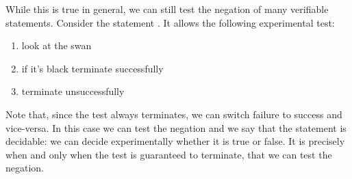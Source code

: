 \documentclass[11pt,letterpaper,fleqn]{memoir} %
\begin{document}
While this is true in general, we can still test the negation of many verifiable statements. Consider the statement . It allows the following experimental test:
\begin{enumerate}
	\item look at the swan
	\item if it's black terminate successfully
	\item terminate unsuccessfully
\end{enumerate}
Note that, since the test always terminates, we can switch failure to success and vice-versa. In this case we can test the negation and we say that the statement is decidable: we can decide experimentally whether it is true or false. It is precisely when and only when the test is guaranteed to terminate, that we can test the negation.
\end{document}
